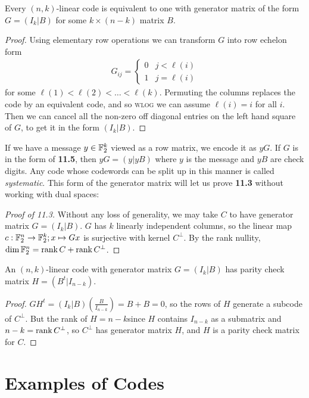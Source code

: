 \documentclass[10pt,a4paper]{article}
\begin{document}
\begin{proposition}
Every $(n,k)$-linear code is equivalent to one with generator matrix of the form $G = (I_k | B)$ for some $k \times (n-k)$ matrix $B$.
\end{proposition}
\begin{proof}
Using elementary row operations we can transform $G$ into row echelon form
\begin{align*}
G_{ij} = \begin{cases} 0 & j < \ell(i)\\1 & j = \ell(i) \end{cases}
\end{align*}
for some $\ell(1) <\ell(2) < \ldots < \ell(k)$. Permuting the columns replaces the code by an equivalent code, and so \textsc{wlog} we can assume $\ell(i) = i$ for all $i$. Then we can cancel all the non-zero off diagonal entries on the left hand square of $G$, to get it in the form $(I_k|B)$.
\end{proof}
If we have a message $y \in \mathbb{F}_2^k$ viewed as a row matrix, we encode it as $yG$. If $G$ is in the form of \textbf{11.5}, then $yG = (y|yB)$ where $y$ is the message and $yB$ are check digits. Any code whose codewords can be split up in this manner is called \emph{systematic}. This form of the generator matrix will let us prove \textbf{11.3} without working with dual spaces:
\begin{proof}[Proof of 11.3]
Without any loss of generality, we may take $C$ to have generator matrix $G = (I_k|B)$. $G$ has $k$ linearly independent columns, so the linear map $c:\mathbb{F}_2^n \to \mathbb{F}_2^k; x \mapsto Gx$ is surjective with kernel $C^{\bot}$. By the rank nullity, $\dim \mathbb{F}_2^n = \operatorname{rank} C + \operatorname{rank} C^{\bot}$.
\end{proof}
\begin{lemma}
An $(n,k)$-linear code with generator matrix $G = (I_k |B)$ has parity check matrix $H = (B^t |I_{n-k})$.
\end{lemma}
\begin{proof}
$GH^t = (I_k |B)\left(\frac{B}{I_{n-k}}\right) = B+B = 0$, so the rows of $H$ generate a subcode of $C^{\bot}$. But the rank of $H = n-k$since $H$ contains $I_{n-k}$ as a submatrix and $n-k = \operatorname{rank} C^{\bot}$, so $C^{\bot}$ has generator matrix $H$, and $H$ is a parity check matrix for $C$.
\end{proof}
\section{Examples of Codes}
\end{document}
